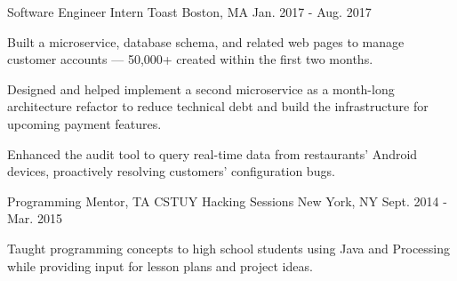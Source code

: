 \begin{cventries}
  \cventry
    {Software Engineer Intern} %
    {Toast} %
    {Boston, MA} %
    {Jan. 2017 - Aug. 2017} %
    {
      \begin{cvitems} %
        \item {Built a microservice, database schema, and related web pages to manage customer accounts --- 50,000+ created within the first two months.}
		\item {Designed and helped implement a second microservice as a month-long architecture refactor to reduce technical debt and build the infrastructure for upcoming payment features.}
		\item {Enhanced the audit tool to query real-time data from restaurants' Android devices, proactively resolving customers' configuration bugs.}
      \end{cvitems}
    }

  \cventry
    {Programming Mentor, TA} %
    {CSTUY Hacking Sessions} %
    {New York, NY} %
    {Sept. 2014 - Mar. 2015} %
    {
      \begin{cvitems} %
        \item {Taught programming concepts to high school students using Java and Processing while providing input for lesson plans and project ideas.}
      \end{cvitems}
    }
  \fi
\end{cventries}
